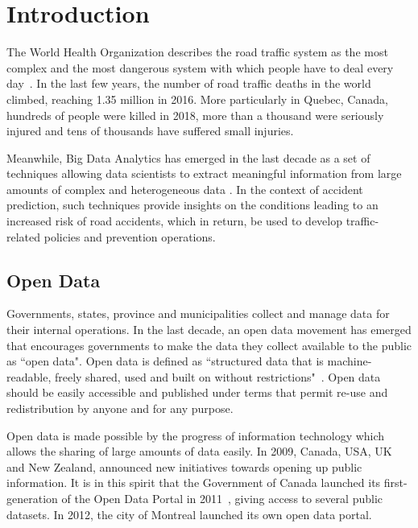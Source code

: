 \documentclass[conference]{IEEEtran}
\newcommand{\TG}[1]{\colorlet{saved}{.}\color{orange}From Tristan: #1\color{saved}}
\begin{document}

\section{Introduction}

The World Health Organization describes the road traffic system as the most
complex and the most dangerous system with which people have to deal every
day~\cite{Peden2004}. In the last few years, the number of road traffic deaths in the world climbed, reaching 1.35 million in 2016\cite{road_safety_report}. More particularly in Quebec, Canada, hundreds of people were killed in 2018, more than a thousand were seriously injured and tens of thousands have suffered small injuries\cite{saaq}.

Meanwhile, Big Data Analytics has emerged in the last decade as a set of techniques allowing data scientists to extract meaningful information from large amounts of complex and heterogeneous data \cite{Gandomi2015}. In the context of accident prediction, such techniques provide insights on the conditions leading to an increased risk of road accidents, which in return, be used to develop traffic-related policies and prevention operations. 


\subsection{Open Data}

Governments, states, province and municipalities collect and manage data for their internal operations. In the last decade, an open data movement has emerged that encourages governments to make the data they collect available to the public as ``open data".
Open data is defined as ``structured data that is machine-readable, freely shared, used and built on without restrictions"~\cite{opendata101}. Open data should be easily accessible and published under terms that permit re-use and redistribution by anyone and for any purpose.

Open data is made possible by the progress of information technology which allows the sharing of large amounts of data easily. In 2009, Canada, USA, UK and New Zealand, announced new initiatives towards opening up public information. It is in this spirit that the Government of Canada launched its first-generation of the Open Data Portal in 2011~\cite{opendata101}, giving access to several public datasets. In 2012, the city of Montreal launched its own open data portal.
\end{document}
